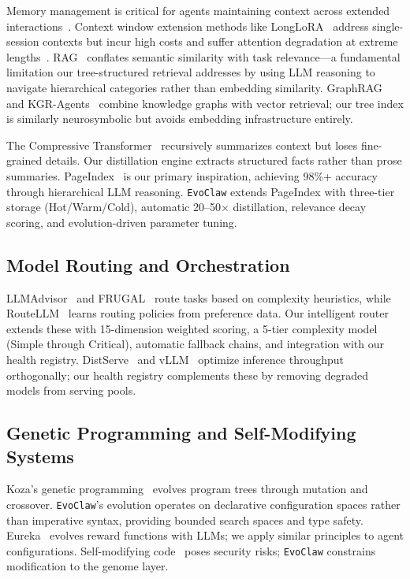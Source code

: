 \documentclass[conference]{IEEEtran}
\newcommand{\evoclaw}{\texttt{EvoClaw}\xspace}
\begin{document}
Memory management is critical for agents maintaining context across extended interactions~\cite{zhong2023token}. Context window extension methods like LongLoRA~\cite{chen2023longlora} address single-session contexts but incur high costs and suffer attention degradation at extreme lengths~\cite{tai2022retrieval}. RAG~\cite{lewis2020retrieval, karpukhin2020dense} conflates semantic similarity with task relevance---a fundamental limitation our tree-structured retrieval addresses by using LLM reasoning to navigate hierarchical categories rather than embedding similarity. GraphRAG~\cite{edge2024graphrag} and KGR-Agents~\cite{wang2024kgr} combine knowledge graphs with vector retrieval; our tree index is similarly neurosymbolic but avoids embedding infrastructure entirely.

The Compressive Transformer~\cite{rae2019compressive} recursively summarizes context but loses fine-grained details. Our distillation engine extracts structured facts rather than prose summaries. PageIndex~\cite{vectifyai_pageindex} is our primary inspiration, achieving 98\%+ accuracy through hierarchical LLM reasoning. \evoclaw{} extends PageIndex with three-tier storage (Hot/Warm/Cold), automatic 20--50$\times$ distillation, relevance decay scoring, and evolution-driven parameter tuning.

\subsection{Model Routing and Orchestration}

LLMAdvisor~\cite{liu2023llm} and FRUGAL~\cite{lyu2023frugal} route tasks based on complexity heuristics, while RouteLLM~\cite{li2024routellm} learns routing policies from preference data. Our intelligent router extends these with 15-dimension weighted scoring, a 5-tier complexity model (Simple through Critical), automatic fallback chains, and integration with our health registry. DistServe~\cite{zheng2023distserve} and vLLM~\cite{kwon2023efficient} optimize inference throughput orthogonally; our health registry complements these by removing degraded models from serving pools.

\subsection{Genetic Programming and Self-Modifying Systems}

Koza's genetic programming~\cite{koza1992gp, angeline1994genetic} evolves program trees through mutation and crossover. \evoclaw{}'s evolution operates on declarative configuration spaces rather than imperative syntax, providing bounded search spaces and type safety. Eureka~\cite{ma2023eureka} evolves reward functions with LLMs; we apply similar principles to agent configurations. Self-modifying code~\cite{vonneumann1966self, smith1984reflection} poses security risks; \evoclaw{} constrains modification to the genome layer.
\end{document}

